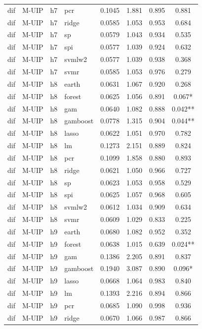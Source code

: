 \begin{ThreePartTable}
\begin{longtable}[t]{llclcccc}
dif & M-UIP & h7 & pcr & 0.1045 & 1.881 & 0.895 & 0.881\\
dif & M-UIP & h7 & ridge & 0.0585 & 1.053 & 0.953 & 0.684\\
dif & M-UIP & h7 & sp & 0.0579 & 1.043 & 0.934 & 0.535\\
dif & M-UIP & h7 & spi & 0.0577 & 1.039 & 0.924 & 0.632\\
dif & M-UIP & h7 & svmlw2 & 0.0577 & 1.039 & 0.938 & 0.368\\
dif & M-UIP & h7 & svmr & 0.0585 & 1.053 & 0.976 & 0.279\\
\addlinespace
dif & M-UIP & h8 & earth & 0.0631 & 1.067 & 0.920 & 0.268\\
dif & M-UIP & h8 & forest & 0.0625 & 1.056 & 0.891 & 0.067*\\
dif & M-UIP & h8 & gam & 0.0640 & 1.082 & 0.888 & 0.042**\\
dif & M-UIP & h8 & gamboost & 0.0778 & 1.315 & 0.904 & 0.044**\\
dif & M-UIP & h8 & lasso & 0.0622 & 1.051 & 0.970 & 0.782\\
dif & M-UIP & h8 & lm & 0.1273 & 2.151 & 0.889 & 0.824\\
dif & M-UIP & h8 & pcr & 0.1099 & 1.858 & 0.880 & 0.893\\
dif & M-UIP & h8 & ridge & 0.0621 & 1.050 & 0.966 & 0.727\\
dif & M-UIP & h8 & sp & 0.0623 & 1.053 & 0.958 & 0.529\\
dif & M-UIP & h8 & spi & 0.0625 & 1.057 & 0.968 & 0.605\\
dif & M-UIP & h8 & svmlw2 & 0.0612 & 1.034 & 0.909 & 0.634\\
dif & M-UIP & h8 & svmr & 0.0609 & 1.029 & 0.833 & 0.225\\
\addlinespace
dif & M-UIP & h9 & earth & 0.0680 & 1.082 & 0.952 & 0.352\\
dif & M-UIP & h9 & forest & 0.0638 & 1.015 & 0.639 & 0.024**\\
dif & M-UIP & h9 & gam & 0.1386 & 2.205 & 0.891 & 0.837\\
dif & M-UIP & h9 & gamboost & 0.1940 & 3.087 & 0.890 & 0.096*\\
dif & M-UIP & h9 & lasso & 0.0668 & 1.064 & 0.983 & 0.840\\
dif & M-UIP & h9 & lm & 0.1393 & 2.216 & 0.894 & 0.866\\
dif & M-UIP & h9 & pcr & 0.0685 & 1.090 & 0.998 & 0.936\\
dif & M-UIP & h9 & ridge & 0.0670 & 1.066 & 0.987 & 0.866\\

\end{longtable}
\end{ThreePartTable}
